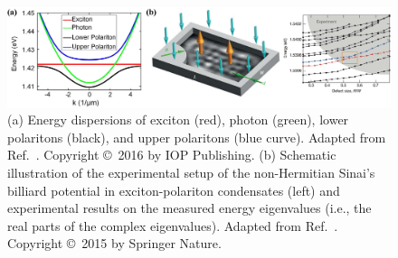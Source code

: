 \documentclass{tADP2e}
\theoremstyle{plain}
\theoremstyle{plain}
\theoremstyle{definition}
\begin{document}
\begin{figure}
\begin{center}
\includegraphics[width=14.5cm]{./Figures/fig_3_exc_pol.pdf}
\end{center}
\caption{(a) Energy dispersions of exciton (red), photon (green), lower  polaritons (black), and upper polaritons (blue curve).   Adapted from Ref.~\cite{Schneider_2016}. Copyright \copyright\,   2016 by IOP Publishing.
(b) Schematic illustration of the experimental setup of the non-Hermitian Sinai's billiard potential in exciton-polariton condensates (left) and experimental results on the measured energy eigenvalues (i.e., the real parts of the complex eigenvalues).
Adapted from Ref.~\cite{GT15}. 
Copyright \copyright\,   2015 by Springer Nature.
}
\label{fig:3excpol}
\end{figure}
\end{document}
